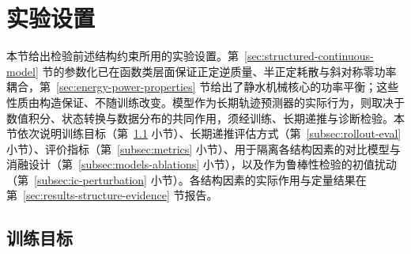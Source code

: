 
\section{实验设置}
\label{sec:training-baselines-protocol}

本节给出检验前述结构约束所用的实验设置。第~\ref{sec:structured-continuous-model} 节的参数化已在函数类层面保证正定逆质量、半正定耗散与斜对称零功率耦合，第~\ref{sec:energy-power-properties} 节给出了静水机械核心的功率平衡；这些性质由构造保证、不随训练改变。模型作为长期轨迹预测器的实际行为，则取决于数值积分、状态转换与数据分布的共同作用，须经训练、长期递推与诊断检验。本节依次说明训练目标（第~\ref{subsec:training-objective} 小节）、长期递推评估方式（第~\ref{subsec:rollout-eval} 小节）、评价指标（第~\ref{subsec:metrics} 小节）、用于隔离各结构因素的对比模型与消融设计（第~\ref{subsec:models-ablations} 小节），以及作为鲁棒性检验的初值扰动（第~\ref{subsec:ic-perturbation} 小节）。各结构因素的实际作用与定量结果在第~\ref{sec:results-structure-evidence} 节报告。

\subsection{训练目标}
\label{subsec:training-objective}

